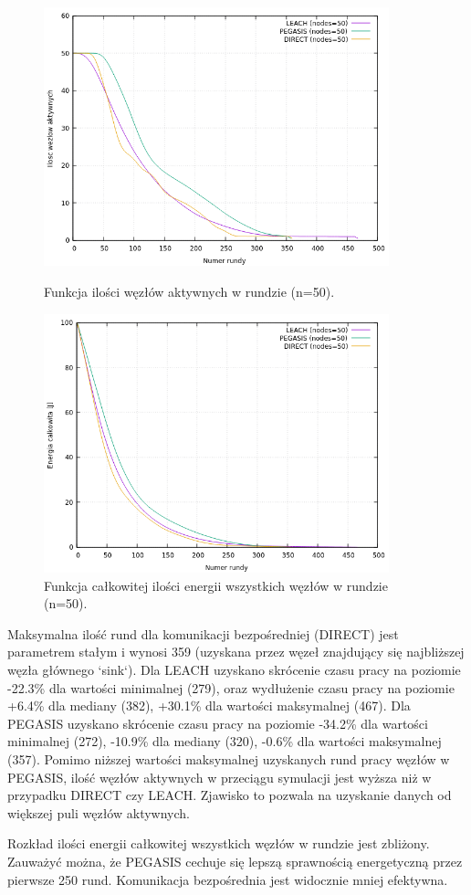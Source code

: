 \documentclass[a4paper,12pt,twoside,openany]{report}
\begin{document}
\begin{figure}[H]
 \centering
 \includegraphics[width=10cm]{images/gnuplot/test_2/nodes_in_round_50.png}
 \caption{Funkcja ilości węzłów aktywnych w rundzie (n=50).}
 \includegraphics[width=10cm]{images/gnuplot/test_2/energy_in_round_50.png}
 \caption{Funkcja całkowitej ilości energii wszystkich węzłów w rundzie (n=50).}
\end{figure}

\par
Maksymalna ilość rund dla komunikacji bezpośredniej (DIRECT) jest parametrem stałym i wynosi 359 (uzyskana przez węzeł znajdujący się najbliższej węzła głównego `sink`).
Dla LEACH uzyskano skrócenie czasu pracy na poziomie -22.3\% dla wartości minimalnej (279), oraz wydłużenie czasu pracy na poziomie +6.4\% dla mediany (382), +30.1\% dla wartości maksymalnej (467).
Dla PEGASIS uzyskano skrócenie czasu pracy na poziomie -34.2\% dla wartości minimalnej (272), -10.9\% dla mediany (320), -0.6\% dla wartości maksymalnej (357).
Pomimo niższej wartości maksymalnej uzyskanych rund pracy węzłów w PEGASIS, ilość węzłów aktywnych w przeciągu symulacji jest wyższa niż w przypadku DIRECT czy LEACH.
Zjawisko to pozwala na uzyskanie danych od większej puli węzłów aktywnych.
\par
Rozkład ilości energii całkowitej wszystkich węzłów w rundzie jest zbliżony.
Zauważyć można, że PEGASIS cechuje się lepszą sprawnością energetyczną przez pierwsze 250 rund.  Komunikacja bezpośrednia jest widocznie mniej efektywna.
\end{document}
